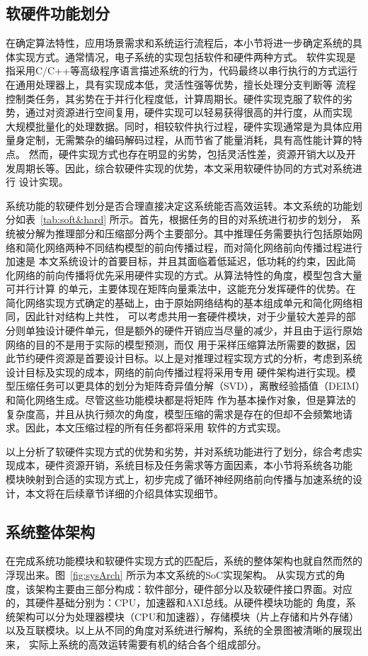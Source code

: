 \subsection{软硬件功能划分}
在确定算法特性，应用场景需求和系统运行流程后，本小节将进一步确定系统的具体实现方式。通常情况，电子系统的实现包括软件和硬件两种方式。
软件实现是指采用C/C++等高级程序语言描述系统的行为，代码最终以串行执行的方式运行在通用处理器上，具有实现成本低，灵活性强等优势，擅长处理分支判断等
流程控制类任务，其劣势在于并行化程度低，计算周期长。硬件实现克服了软件的劣势，通过对资源进行空间复用，硬件实现可以轻易获得很高的并行度，从而实现
大规模批量化的处理数据。同时，相较软件执行过程，硬件实现通常是为具体应用量身定制，无需繁杂的编码解码过程，从而节省了能量消耗，具有高性能计算的特点。
然而，硬件实现方式也存在明显的劣势，包括灵活性差，资源开销大以及开发周期长等。因此，综合软硬件实现的优势，本文采用软硬件协同的方式对系统进行
设计实现。

系统功能的软硬件划分是否合理直接决定这系统能否高效运转。本文系统的功能划分如表~\ref{tab:soft&hard} 所示。首先，根据任务的目的对系统进行初步的划分，
系统被分解为推理部分和压缩部分两个主要部分。其中推理任务需要执行包括原始网络和简化网络两种不同结构模型的前向传播过程，而对简化网络前向传播过程进行加速是
本文系统设计的首要目标，并且其面临着低延迟，低功耗的约束，因此简化网络的前向传播将优先采用硬件实现的方式。从算法特性的角度，模型包含大量可并行计算
的单元，主要体现在矩阵向量乘法中，这能充分发挥硬件的优势。在简化网络实现方式确定的基础上，由于原始网络结构的基本组成单元和简化网络相同，因此针对结构上共性，
可以考虑共用一套硬件模块，对于少量较大差异的部分则单独设计硬件单元，但是额外的硬件开销应当尽量的减少，并且由于运行原始网络的目的不是用于实际的模型预测，而仅
用于采样压缩算法所需要的数据，因此节约硬件资源是首要设计目标。以上是对推理过程实现方式的分析，考虑到系统设计目标及实现的成本，网络的前向传播过程将采用专用
硬件架构进行实现。模型压缩任务可以更具体的划分为矩阵奇异值分解（SVD），离散经验插值（DEIM）和简化网络生成。尽管这些功能模块都是将矩阵
作为基本操作对象，但是算法的复杂度高，并且从执行频次的角度，模型压缩的需求是存在的但却不会频繁地请求。因此，本文压缩过程的所有任务都将采用
软件的方式实现。

\vspace{-3em}

以上分析了软硬件实现方式的优势和劣势，并对系统功能进行了划分，综合考虑实现成本，硬件资源开销，系统目标及任务需求等方面因素，本小节将系统各功能
模块映射到合适的实现方式上，初步完成了循环神经网络前向传播与加速系统的设计，本文将在后续章节详细的介绍具体实现细节。
\subsection{系统整体架构}
在完成系统功能模块和软硬件实现方式的匹配后，系统的整体架构也就自然而然的浮现出来。图~\ref{fig:sysArch} 所示为本文系统的SoC实现架构。
从实现方式的角度，该架构主要由三部分构成：软件部分，硬件部分以及软硬件接口界面。对应的，其硬件基础分别为：CPU，加速器和AXI总线。从硬件模块功能的
角度，系统架构可以分为处理器模块（CPU和加速器），存储模块（片上存储和片外存储）以及互联模块。以上从不同的角度对系统进行解构，系统的全景图被清晰的展现出来，
实际上系统的高效运转需要有机的结合各个组成部分。

